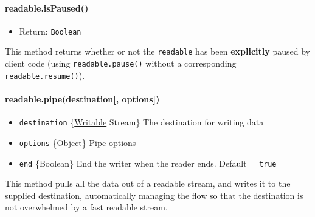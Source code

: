 \paragraph{readable.isPaused()}\label{readable.ispaused}

\begin{itemize}
\itemsep1pt\parskip0pt
\item
  Return: \texttt{Boolean}
\end{itemize}

This method returns whether or not the \texttt{readable} has been
\textbf{explicitly} paused by client code (using
\texttt{readable.pause()} without a corresponding
\texttt{readable.resume()}).

\begin{Shaded}
\begin{Highlighting}[]
  

\NormalTok{() }
\NormalTok{()}
\NormalTok{() }
\NormalTok{()}
\NormalTok{() }
\end{Highlighting}
\end{Shaded}

\paragraph{readable.pipe(destination{[},
options{]})}\label{readable.pipedestination-options}

\begin{itemize}
\itemsep1pt\parskip0pt
\item
  \texttt{destination}
  \{\hyperref[streamux5fclassux5fstreamux5fwritable]{Writable} Stream\}
  The destination for writing data
\item
  \texttt{options} \{Object\} Pipe options
\item
  \texttt{end} \{Boolean\} End the writer when the reader ends. Default
  = \texttt{true}
\end{itemize}

This method pulls all the data out of a readable stream, and writes it
to the supplied destination, automatically managing the flow so that the
destination is not overwhelmed by a fast readable stream.

